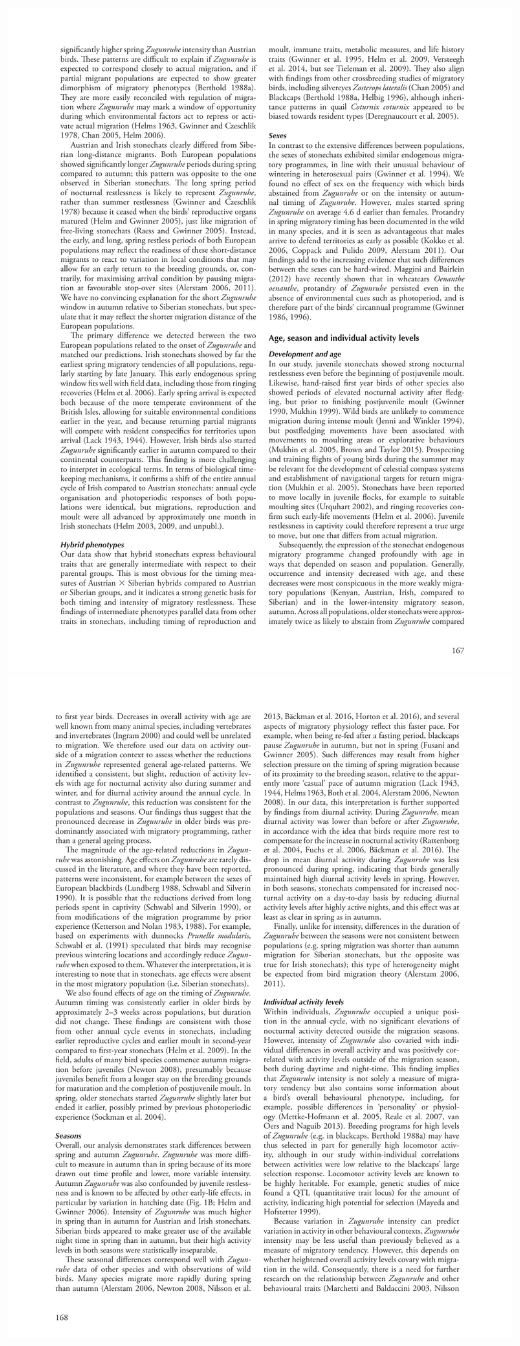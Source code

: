 \documentclass[a4paper, twoside]{templates/ociamthesis}
\begin{document}
\includegraphics[width=1\linewidth]{pdf_chapters/zug/zug_crop_Part13}
\includegraphics[width=1\linewidth]{pdf_chapters/zug/zug_crop_Part14}
\end{document}
